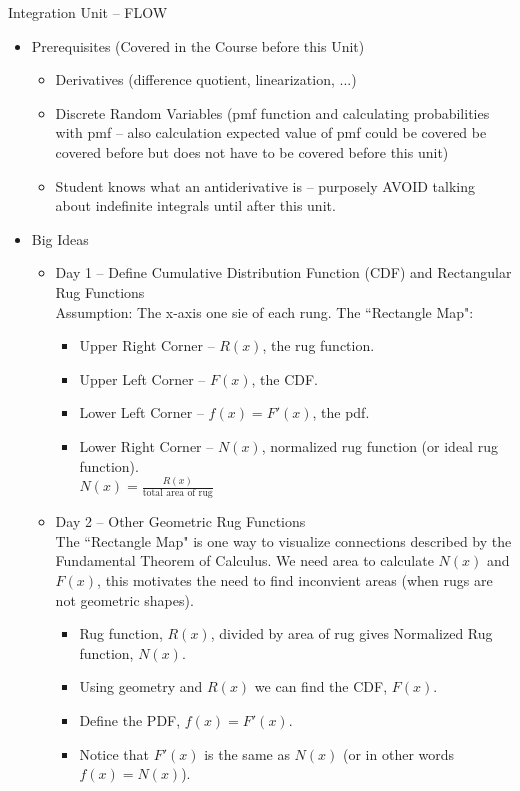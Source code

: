 \documentclass[letterpaper,oneside]{book}%
\theoremstyle{plain}
\theoremstyle{box}
\theoremstyle{problem}
\begin{document}
Integration Unit -- FLOW
\begin{itemize}
\item Prerequisites (Covered in the Course before this Unit)
\begin{itemize}
\item Derivatives (difference quotient, linearization, ...)
\item Discrete Random Variables (pmf function and calculating probabilities with pmf -- also calculation expected value of pmf could be covered be covered before but does not have to be covered before this unit)
\item Student knows what an antiderivative is -- purposely AVOID talking about indefinite integrals until after this unit.
\end{itemize}
\item Big Ideas
\begin{itemize}
\item Day 1 -- Define Cumulative Distribution Function (CDF) and Rectangular Rug Functions\\
Assumption: The x-axis one sie of each rung.
The ``Rectangle Map": 
\begin{itemize}
\item Upper Right Corner -- $R(x)$, the rug function.
\item Upper Left Corner -- $F(x)$, the CDF.
\item Lower Left Corner -- $f(x) = F'(x)$, the pdf.
\item Lower Right Corner -- $N(x)$, normalized rug function (or ideal rug function).\\
$N(x) = \frac{R(x)}{\text{total area of rug}}$
\end{itemize}
\item Day 2 -- Other Geometric Rug Functions\\
The ``Rectangle Map" is one way to visualize connections described by the Fundamental Theorem of Calculus. We need area to calculate $N(x)$ and $F(x)$, this motivates the need to find inconvient areas (when rugs are not geometric shapes). 
\begin{itemize}
\item Rug function, $R(x)$, divided by area of rug gives Normalized Rug function, $N(x)$.
\item Using geometry and $R(x)$ we can find the CDF, $F(x)$.
\item Define the PDF, $f(x) = F'(x)$.
\item Notice that $F'(x)$ is the same as $N(x)$ (or in other words $f(x) = N(x)$).

\end{itemize}
\end{itemize}
\end{itemize}
\end{document}
